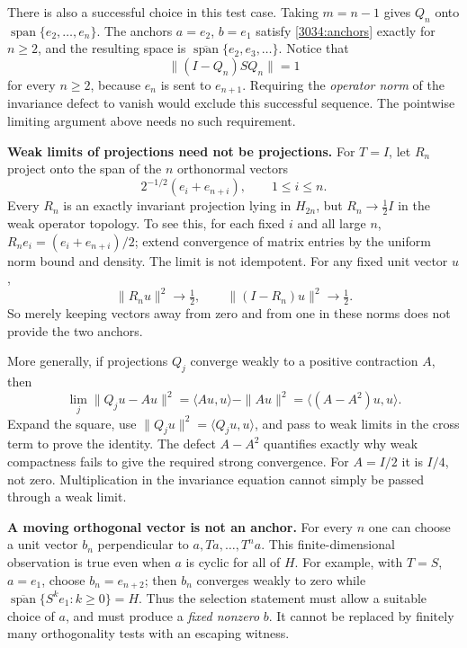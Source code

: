 \documentclass[11pt,a4paper]{article}
\numberwithin{equation}{section}
\begin{document}
There is also a successful choice in this test case. Taking $m=n-1$ gives
$Q_n$ onto $\operatorname{span}\{e_2,\ldots,e_n\}$. The anchors $a=e_2$,
$b=e_1$ satisfy \eqref{3034:anchors} exactly for $n\geq2$, and the resulting
space is $\overline{\operatorname{span}}\{e_2,e_3,\ldots\}$. Notice that
\[
 \|(I-Q_n)SQ_n\|=1
\]
for every $n\geq2$, because $e_n$ is sent to $e_{n+1}$. Requiring the
\emph{operator norm} of the invariance defect to vanish would exclude this
successful sequence. The pointwise limiting argument above needs no such
requirement.

\textbf{Weak limits of projections need not be projections.}
For $T=I$, let $R_n$ project onto the span of the $n$ orthonormal vectors
\[
 2^{-1/2}(e_i+e_{n+i}),\qquad1\leq i\leq n.
\]
Every $R_n$ is an exactly invariant projection lying in $H_{2n}$, but
$R_n\to\tfrac12 I$ in the weak operator topology. To see this, for each fixed
$i$ and all large $n$,
$R_ne_i=(e_i+e_{n+i})/2$; extend convergence of matrix entries by the uniform
norm bound and density. The limit is not idempotent. For any fixed unit
vector $u$,
\[
 \|R_nu\|^2\to\tfrac12,
 \qquad\|(I-R_n)u\|^2\to\tfrac12.
\]
So merely keeping vectors away from zero and from one in these norms does
not provide the two anchors.

More generally, if projections $Q_j$ converge weakly to a positive
contraction $A$, then
\begin{equation}\label{3034:variance}
 \lim_j\|Q_ju-Au\|^2
 =\langle Au,u\rangle-\|Au\|^2
 =\langle(A-A^2)u,u\rangle.
\end{equation}
Expand the square, use $\|Q_ju\|^2=\langle Q_ju,u\rangle$, and pass to
weak limits in the cross term to prove the identity. The defect $A-A^2$
quantifies exactly why weak compactness fails to give the required strong
convergence. For $A=I/2$ it is $I/4$, not zero. Multiplication in the
invariance equation cannot simply be passed through a weak limit.

\textbf{A moving orthogonal vector is not an anchor.}
For every $n$ one can choose a unit vector $b_n$ perpendicular to
$a,Ta,\ldots,T^na$. This finite-dimensional observation is true even when
$a$ is cyclic for all of $H$. For example, with $T=S$, $a=e_1$, choose
$b_n=e_{n+2}$; then $b_n$ converges weakly to zero while
$\overline{\operatorname{span}}\{S^ke_1:k\geq0\}=H$.
Thus the selection statement must allow a suitable choice of $a$, and must
produce a \emph{fixed nonzero} $b$. It cannot be replaced by finitely many
orthogonality tests with an escaping witness.
\end{document}
